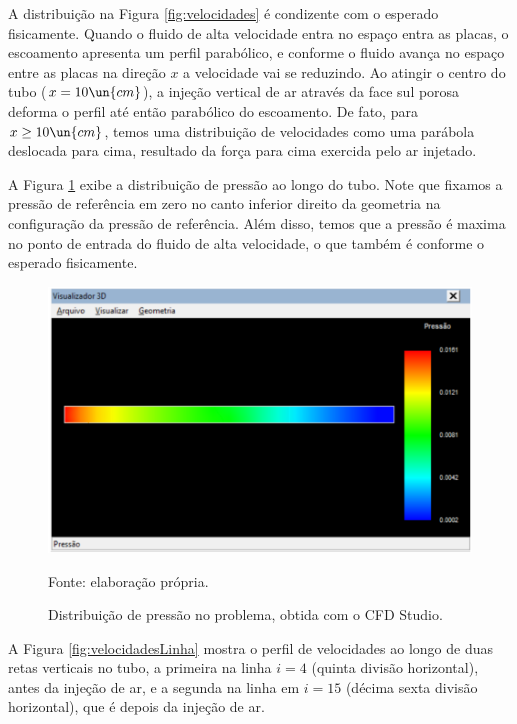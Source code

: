 A distribuição na Figura \ref*{fig:velocidades} é condizente com o esperado fisicamente. Quando 
o fluido de alta velocidade entra no espaço entra as placas, o escoamento apresenta um perfil
parabólico, e conforme o fluido avança no espaço entre as placas na direção $x$ a 
velocidade vai se reduzindo. Ao atingir o centro do tubo ($x = 10 \un{cm}$), a injeção
vertical de ar através da face sul porosa deforma o perfil até então parabólico do escoamento.
De fato, para $x \geq 10 \un{cm}$, temos uma distribuição de velocidades como uma parábola deslocada
para cima, resultado da força para cima exercida pelo ar injetado.

A Figura \ref*{fig:pressao} exibe a distribuição de pressão ao longo do tubo. Note que fixamos a pressão de referência 
em zero no canto inferior direito da geometria na configuração da pressão de referência.
Além disso, temos que a pressão é maxima no ponto de entrada do fluido de alta velocidade,
o que também é conforme o esperado fisicamente.

\begin{figure}[h!]
    \caption{Distribuição de pressão no problema, obtida com o CFD Studio.}
    \label{fig:pressao}
    \centering
    \centerline{\includegraphics[scale=0.45]{pressao.png}}
    \par{Fonte: elaboração própria.}
\end{figure}

A Figura \ref*{fig:velocidadesLinha} mostra o perfil de velocidades ao longo de duas retas
verticais no tubo, a primeira na linha $i = 4$ (quinta divisão horizontal), antes da injeção 
de ar, e a segunda na linha em $i = 15$ (décima sexta divisão horizontal), que é depois
da injeção de ar.

